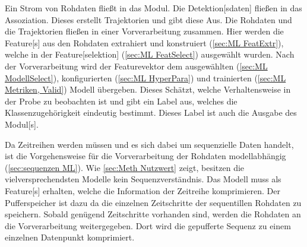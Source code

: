 
Ein Strom von Rohdaten fließt in das \gls{Modul}. Die \gls{Detektion}[sdaten] fließen in das \gls{Assoziation}. Dieses erstellt Trajektorien und gibt diese Aus. Die Rohdaten und die Trajektorien fließen in einer Vorverarbeitung zusammen. Hier werden die \gls{Feature}[s] aus den Rohdaten extrahiert und konstruiert (\ref{sec:ML FeatExtr}), welche in der \gls{Feature}[selektion] (\ref{sec:ML FeatSelect}) ausgewählt wurden. Nach der Vorverarbeitung wird der \gls{Featurevektor} dem ausgewählten (\ref{sec:ML ModellSelect}), konfigurierten (\ref{sec:ML HyperPara}) und trainierten (\ref{sec:ML Metriken, Valid}) Modell übergeben. Dieses Schätzt, welche Verhaltensweise in der Probe zu beobachten ist und gibt ein \gls{Label} aus, welches die Klassenzugehörigkeit eindeutig bestimmt. Dieses \gls{Label} ist auch die Ausgabe des \gls{Modul}[s]. \par

Da Zeitreihen  werden müssen und es sich dabei um sequenzielle Daten handelt, ist die Vorgehensweise für die Vorverarbeitung der Rohdaten modellabhängig (\ref{sec:sequenzen ML}). Wie \ref{sec:Meth Nutzwert} zeigt, besitzen die vielversprechendsten Modelle kein Sequenzverständnis. Das Modell muss als \gls{Feature}[s] erhalten, welche die Information der Zeitreihe komprimieren. Der Pufferspeicher ist dazu da die einzelnen Zeitschritte der sequentillen Rohdaten zu speichern. Sobald genügend Zeitschritte vorhanden sind, werden die Rohdaten an die Vorverarbeitung weitergegeben. Dort wird die gepufferte Sequenz zu einem einzelnen Datenpunkt komprimiert. 
